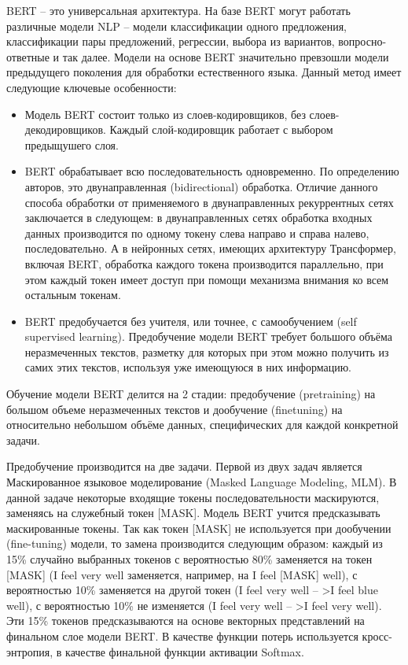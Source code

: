 BERT -- это универсальная архитектура. На базе BERT могут работать различные модели NLP -- модели классификации одного предложения, классификации пары предложений, регрессии, выбора из вариантов, вопросно-ответные и так далее. Модели на основе BERT значительно превзошли модели предыдущего поколения для обработки естественного языка. 
Данный метод имеет следующие ключевые особенности:
\begin{itemize}
\item Модель BERT состоит только из слоев-кодировщиков, без слоев-декодировщиков. Каждый слой-кодировщик работает с выбором предыщушего слоя.
\item BERT обрабатывает всю последовательность одновременно. По определению авторов, это двунаправленная (bidirectional) обработка. Отличие данного способа обработки от применяемого в двунаправленных рекуррентных сетях заключается в следующем: в двунаправленных сетях обработка входных данных производится по одному токену слева направо и справа налево, последовательно. А в нейронных сетях, имеющих архитектуру Трансформер, включая BERT, обработка каждого токена производится параллельно, при этом каждый токен имеет доступ при помощи механизма внимания ко всем остальным токенам. 
\item BERT предобучается без учителя, или точнее, с самообучением (self supervised learning). Предобучение модели BERT требует большого объёма неразмеченных текстов, разметку для которых при этом можно получить из самих этих текстов, используя уже имеющуюся в них информацию.
\end{itemize}
Обучение модели BERT делится на 2 стадии: предобучение (pretraining) на большом объеме неразмеченных текстов и дообучение (finetuning) на относительно небольшом объёме данных, специфических для каждой конкретной задачи.

Предобучение производится на две задачи. Первой из двух задач является Маскированное языковое моделирование (Masked Language Modeling, MLM). В данной задаче некоторые входящие токены последовательности маскируются, заменяясь на служебный токен [MASK]. Модель BERT учится предсказывать маскированные токены. Так как токен [MASK] не используется при дообучении (fine-tuning) модели, то замена производится следующим образом: каждый из 15\% случайно выбранных токенов с вероятностью 80\% заменяется на токен [MASK] (I feel very well заменяется, например, на I feel [MASK] well), с вероятностью 10\% заменяется на другой токен (I feel very well -- >I feel blue well), с вероятностью 10\% не изменяется (I feel very well -- >I feel very well). Эти 15\% токенов предсказываются на основе векторных представлений на финальном слое модели BERT. В качестве функции потерь используется кросс-энтропия, в качестве финальной функции активации Softmax. 


